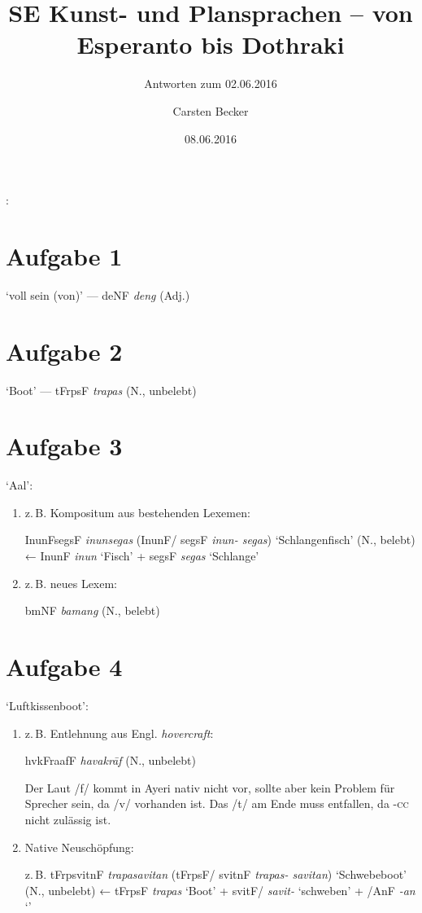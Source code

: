 \documentclass[12pt,paper=a4]{scrartcl}
\author{Carsten Becker}
\title{SE Kunst- und Plansprachen -- von Esperanto bis Dothraki}
\subtitle{Antworten zum 02.06.2016}
\date{08.06.2016} %
\newcommand{\ayr}[1]{{\Tagati #1}}
\newcommand{\xayr}[3]{{\Tagati #1} \emph{#2} `#3'}
\newenvironment{mytitle}{
    \hfill
    \begin{minipage}{0.667\textwidth}
	\vspace{\baselineskip}
	\begin{center}
	    \Large
	    \sffamily\bfseries
	    \makeatletter
}{
	    \makeatother
	\end{center}
	\vspace{1em}
    \end{minipage}
    \hfill
}
\begin{document}

\begin{mytitle}
    \@title: \@subtitle\footnotemark
\end{mytitle}

\section{Aufgabe 1}
`voll sein (von)' --- \ayr{deNF} \textit{deng} (Adj.)

\section{Aufgabe 2}
`Boot' --- \ayr{tFrpsF} \textit{trapas} (N., unbelebt)

\section{Aufgabe 3}
`Aal':

\begin{enumerate}[label={(\alph*)}]
	\item z.\,B. Kompositum aus bestehenden Lexemen:
	
		\ayr{InunFsegsF} \textit{inunsegas} (\ayr{InunF/ segsF} 
		\textit{inun- segas}) `Schlangenfisch' (N., belebt) ← 
		\xayr{InunF}{inun}{Fisch} + \xayr{segsF}{segas}{Schlange}

	\item z.\,B. neues Lexem:
	
		\ayr{bmNF} \textit{bamang} (N., belebt)
		
\end{enumerate}

\section{Aufgabe 4}
`Luftkissenboot':

\begin{enumerate}[label={(\alph*)}]
	
	\item z.\,B. Entlehnung aus Engl. \textit{hovercraft}:
	
		\ayr{hvkFraafF} \textit{havakrāf} (N., unbelebt)
		
		Der Laut /f/ kommt in Ayeri nativ nicht vor, sollte aber kein 
		Problem für Sprecher sein, da /v/ vorhanden ist. Das /t/ am Ende 
		muss entfallen, da \textsc{-cc} nicht zulässig ist.
		
		\item Native Neuschöpfung:
		
		z.\,B. \ayr{tFrpsvitnF} \textit{trapasavitan} 
		(\ayr{tFrpsF/ svitnF} \textit{trapas- savitan})
		`Schwebeboot' (N., unbelebt) ← \xayr{tFrpsF}{trapas}{Boot} + 
		\xayr{svitF/}{savit-}{schweben} + \xayr{/AnF}{-an}{\Nmlz{}}
		
	\end{enumerate}
\end{document}
